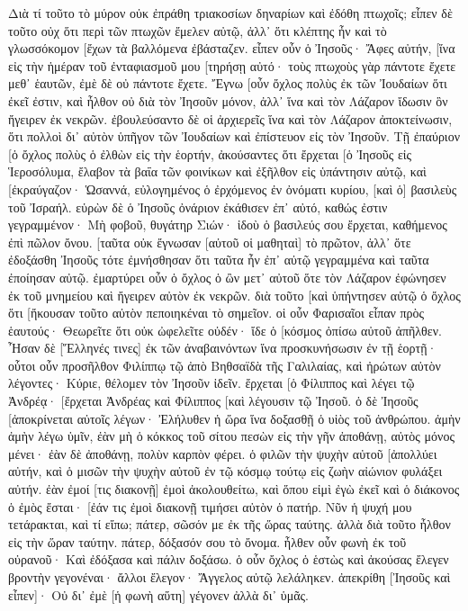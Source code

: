 Διὰ τί τοῦτο τὸ μύρον οὐκ ἐπράθη τριακοσίων δηναρίων καὶ ἐδόθη πτωχοῖς; 
εἶπεν δὲ τοῦτο οὐχ ὅτι περὶ τῶν πτωχῶν ἔμελεν αὐτῷ, ἀλλ᾽ ὅτι κλέπτης ἦν καὶ τὸ γλωσσόκομον [ἔχων τὰ βαλλόμενα ἐβάσταζεν. 
εἶπεν οὖν ὁ Ἰησοῦς· Ἄφες αὐτήν, [ἵνα εἰς τὴν ἡμέραν τοῦ ἐνταφιασμοῦ μου [τηρήσῃ αὐτό· 
τοὺς πτωχοὺς γὰρ πάντοτε ἔχετε μεθ᾽ ἑαυτῶν, ἐμὲ δὲ οὐ πάντοτε ἔχετε. 
Ἔγνω [οὖν ὄχλος πολὺς ἐκ τῶν Ἰουδαίων ὅτι ἐκεῖ ἐστιν, καὶ ἦλθον οὐ διὰ τὸν Ἰησοῦν μόνον, ἀλλ᾽ ἵνα καὶ τὸν Λάζαρον ἴδωσιν ὃν ἤγειρεν ἐκ νεκρῶν. 
ἐβουλεύσαντο δὲ οἱ ἀρχιερεῖς ἵνα καὶ τὸν Λάζαρον ἀποκτείνωσιν, 
ὅτι πολλοὶ δι᾽ αὐτὸν ὑπῆγον τῶν Ἰουδαίων καὶ ἐπίστευον εἰς τὸν Ἰησοῦν. 
Τῇ ἐπαύριον [ὁ ὄχλος πολὺς ὁ ἐλθὼν εἰς τὴν ἑορτήν, ἀκούσαντες ὅτι ἔρχεται [ὁ Ἰησοῦς εἰς Ἱεροσόλυμα, 
ἔλαβον τὰ βαΐα τῶν φοινίκων καὶ ἐξῆλθον εἰς ὑπάντησιν αὐτῷ, καὶ [ἐκραύγαζον· Ὡσαννά, εὐλογημένος ὁ ἐρχόμενος ἐν ὀνόματι κυρίου, [καὶ ὁ] βασιλεὺς τοῦ Ἰσραήλ. 
εὑρὼν δὲ ὁ Ἰησοῦς ὀνάριον ἐκάθισεν ἐπ᾽ αὐτό, καθώς ἐστιν γεγραμμένον· 
Μὴ φοβοῦ, θυγάτηρ Σιών· ἰδοὺ ὁ βασιλεύς σου ἔρχεται, καθήμενος ἐπὶ πῶλον ὄνου. 
[ταῦτα οὐκ ἔγνωσαν [αὐτοῦ οἱ μαθηταὶ] τὸ πρῶτον, ἀλλ᾽ ὅτε ἐδοξάσθη Ἰησοῦς τότε ἐμνήσθησαν ὅτι ταῦτα ἦν ἐπ᾽ αὐτῷ γεγραμμένα καὶ ταῦτα ἐποίησαν αὐτῷ. 
ἐμαρτύρει οὖν ὁ ὄχλος ὁ ὢν μετ᾽ αὐτοῦ ὅτε τὸν Λάζαρον ἐφώνησεν ἐκ τοῦ μνημείου καὶ ἤγειρεν αὐτὸν ἐκ νεκρῶν. 
διὰ τοῦτο [καὶ ὑπήντησεν αὐτῷ ὁ ὄχλος ὅτι [ἤκουσαν τοῦτο αὐτὸν πεποιηκέναι τὸ σημεῖον. 
οἱ οὖν Φαρισαῖοι εἶπαν πρὸς ἑαυτούς· Θεωρεῖτε ὅτι οὐκ ὠφελεῖτε οὐδέν· ἴδε ὁ [κόσμος ὀπίσω αὐτοῦ ἀπῆλθεν. 
Ἦσαν δὲ [Ἕλληνές τινες] ἐκ τῶν ἀναβαινόντων ἵνα προσκυνήσωσιν ἐν τῇ ἑορτῇ· 
οὗτοι οὖν προσῆλθον Φιλίππῳ τῷ ἀπὸ Βηθσαϊδὰ τῆς Γαλιλαίας, καὶ ἠρώτων αὐτὸν λέγοντες· Κύριε, θέλομεν τὸν Ἰησοῦν ἰδεῖν. 
ἔρχεται [ὁ Φίλιππος καὶ λέγει τῷ Ἀνδρέᾳ· [ἔρχεται Ἀνδρέας καὶ Φίλιππος [καὶ λέγουσιν τῷ Ἰησοῦ. 
ὁ δὲ Ἰησοῦς [ἀποκρίνεται αὐτοῖς λέγων· Ἐλήλυθεν ἡ ὥρα ἵνα δοξασθῇ ὁ υἱὸς τοῦ ἀνθρώπου. 
ἀμὴν ἀμὴν λέγω ὑμῖν, ἐὰν μὴ ὁ κόκκος τοῦ σίτου πεσὼν εἰς τὴν γῆν ἀποθάνῃ, αὐτὸς μόνος μένει· ἐὰν δὲ ἀποθάνῃ, πολὺν καρπὸν φέρει. 
ὁ φιλῶν τὴν ψυχὴν αὐτοῦ [ἀπολλύει αὐτήν, καὶ ὁ μισῶν τὴν ψυχὴν αὐτοῦ ἐν τῷ κόσμῳ τούτῳ εἰς ζωὴν αἰώνιον φυλάξει αὐτήν. 
ἐὰν ἐμοί [τις διακονῇ] ἐμοὶ ἀκολουθείτω, καὶ ὅπου εἰμὶ ἐγὼ ἐκεῖ καὶ ὁ διάκονος ὁ ἐμὸς ἔσται· [ἐάν τις ἐμοὶ διακονῇ τιμήσει αὐτὸν ὁ πατήρ. 
Νῦν ἡ ψυχή μου τετάρακται, καὶ τί εἴπω; πάτερ, σῶσόν με ἐκ τῆς ὥρας ταύτης. ἀλλὰ διὰ τοῦτο ἦλθον εἰς τὴν ὥραν ταύτην. 
πάτερ, δόξασόν σου τὸ ὄνομα. ἦλθεν οὖν φωνὴ ἐκ τοῦ οὐρανοῦ· Καὶ ἐδόξασα καὶ πάλιν δοξάσω. 
ὁ οὖν ὄχλος ὁ ἑστὼς καὶ ἀκούσας ἔλεγεν βροντὴν γεγονέναι· ἄλλοι ἔλεγον· Ἄγγελος αὐτῷ λελάληκεν. 
ἀπεκρίθη [Ἰησοῦς καὶ εἶπεν]· Οὐ δι᾽ ἐμὲ [ἡ φωνὴ αὕτη] γέγονεν ἀλλὰ δι᾽ ὑμᾶς. 
